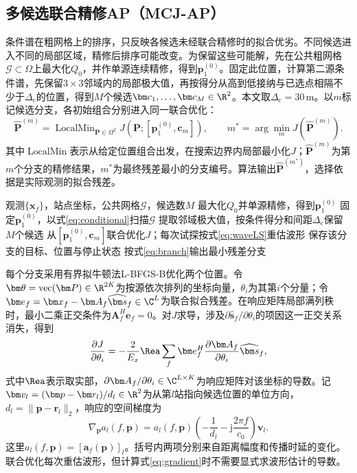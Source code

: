 \subsection{多候选联合精修AP（MCJ-AP）}\label{sec:mcj}
条件谱在粗网格上的排序，只反映各候选未经联合精修时的拟合优劣。不同候选进入不同的局部区域，精修后排序可能改变。为保留这些可能解，先在公共粗网格$\mathcal G\subset\Omega$上最大化$Q_0$，并作单源连续精修，得到$\bm p_1^{(0)}$。固定此位置，计算第二源条件谱，先保留$3\times3$邻域内的局部极大值，再按得分从高到低接纳与已选点相隔不少于$\Delta_{\mathrm c}$的位置，得到$M$个候选$\bm c_1,\ldots,\bm c_M\in\R^2$。本文取$\Delta_{\mathrm c}=30$\,m。以$m$标记候选分支，各初始组合分别进入同一联合优化：
\begin{equation}
 \widehat{\bm P}^{(m)}=\operatorname{LocalMin}_{\bm P\in\Omega^2}
 J(\bm P;[\bm p_1^{(0)},\bm c_m]),\qquad
 m^*=\arg\min_m J(\widehat{\bm P}^{(m)}).\label{eq:branch}
\end{equation}
其中$\operatorname{LocalMin}$表示从给定位置组合出发，在搜索边界内局部最小化$J$；$\widehat{\bm P}^{(m)}$为第$m$个分支的精修结果，$m^*$为最终残差最小的分支编号。算法输出$\widehat{\bm P}^{(m^*)}$，选择依据是实际观测的拟合残差。

\begin{algorithm}[H]
\caption{多候选联合精修AP}\label{alg:ap}
\begin{algorithmic}[1]
\Require 观测$\{\bm x_f\}$，站点坐标，公共网格$\mathcal G$，候选数$M$
\State 最大化$Q_0$并单源精修，得到$\bm p_1^{(0)}$
\State 固定$\bm p_1^{(0)}$，以式\eqref{eq:conditional}扫描$\mathcal G$
\State 提取邻域极大值，按条件得分和间距$\Delta_{\mathrm c}$保留$M$个候选
  \State 从$[\bm p_1^{(0)},\bm c_m]$联合优化$J$；每次试探按式\eqref{eq:waveLS}重估波形
  \State 保存该分支的目标、位置与停止状态
\EndFor
\State 按式\eqref{eq:branch}输出最小残差分支
\end{algorithmic}
\end{algorithm}

每个分支采用有界拟牛顿法L-BFGS-B优化两个位置\cite{Byrd1995}。令$\bm\theta=\operatorname{vec}(\bm P)\in\R^{2K}$为按源依次排列的坐标向量，$\theta_i$为其第$i$个分量；令$\bm e_f=\bm x_f-\bm A_f\widehat{\bm s}_f\in\C^L$为联合拟合残差。在响应矩阵局部满列秩时，最小二乘正交条件为$\bm A_f^H\bm e_f=0$。对$J$求导，涉及$\partial\widehat{\bm s}_f/\partial\theta_i$的项因这一正交关系消失，得到\cite{GolubPereyra1973}
\begin{equation}
 \frac{\partial J}{\partial\theta_i}
 =-\frac{2}{E_x}\Rea\sum_f
 \bm e_f^H\frac{\partial\bm A_f}{\partial\theta_i}
 \widehat{\bm s}_f,\label{eq:gradient}
\end{equation}
式中$\Rea$表示取实部，$\partial\bm A_f/\partial\theta_i\in\C^{L\times K}$为响应矩阵对该坐标的导数。记$\bm v_l=(\bm p-\bm r_l)/d_l\in\R^2$为从第$l$站指向候选位置的单位方向，$d_l=\|\bm p-\bm r_l\|_2$，响应的空间梯度为
\begin{equation}
 \nabla_{\bm p}a_l(f,\bm p)
 =a_l(f,\bm p)\left(-\frac1{d_l}-\mathrm j\frac{2\pi f}{c_0}\right)\bm v_l.
 \label{eq:responseDerivative}
\end{equation}
这里$a_l(f,\bm p)=[\bm a_f(\bm p)]_l$。括号内两项分别来自距离幅度和传播时延的变化。联合优化每次重估波形，但计算式\eqref{eq:gradient}时不需要显式求波形估计的导数。

